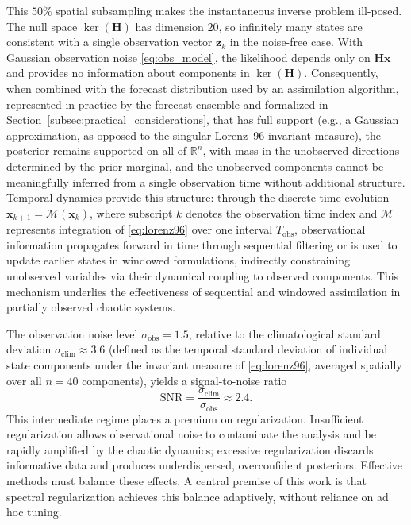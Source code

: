 \documentclass[11pt,a4paper]{article}
\begin{document}
This $50\%$ spatial subsampling makes the instantaneous inverse problem ill-posed. The null space $\ker(\mathbf{H})$ has dimension $20$, so infinitely many states are consistent with a single observation vector $\mathbf{z}_k$ in the noise-free case. With Gaussian observation noise \eqref{eq:obs_model}, the likelihood depends only on $\mathbf{H}\mathbf{x}$ and provides no information about components in $\ker(\mathbf{H})$.
Consequently, when combined with the forecast distribution used by an assimilation algorithm, represented in practice by the forecast ensemble and formalized in Section~\ref{subsec:practical_considerations}, that has full support (e.g., a Gaussian approximation, as opposed to the singular Lorenz–96 invariant measure), the posterior remains supported on all of $\mathbb{R}^n$, with mass in the unobserved directions determined by the prior marginal, and the unobserved components cannot be meaningfully inferred from a single observation time without additional structure.
 Temporal dynamics provide this structure: through the discrete-time evolution $\mathbf{x}_{k+1}=\mathcal{M}(\mathbf{x}_k)$, where subscript $k$ denotes the observation time index and $\mathcal{M}$ represents integration of \eqref{eq:lorenz96} over one interval $T_{\mathrm{obs}}$, observational information propagates forward in time through sequential filtering or is used to update earlier states in windowed formulations, indirectly constraining unobserved variables via their dynamical coupling to observed components. This mechanism underlies the effectiveness of sequential and windowed assimilation in partially observed chaotic systems.

The observation noise level $\sigma_{\mathrm{obs}}=1.5$, relative to the climatological standard deviation $\sigma_{\mathrm{clim}}\approx 3.6$ (defined as the temporal standard deviation of individual state components under the invariant measure of \eqref{eq:lorenz96}, averaged spatially over all $n=40$ components), yields a signal-to-noise ratio
\begin{equation}
\mathrm{SNR}
=
\frac{\sigma_{\mathrm{clim}}}{\sigma_{\mathrm{obs}}}
\approx 2.4.
\label{eq:snr}
\end{equation}
This intermediate regime places a premium on regularization. Insufficient regularization allows observational noise to contaminate the analysis and be rapidly amplified by the chaotic dynamics; excessive regularization discards informative data and produces underdispersed, overconfident posteriors. Effective methods must balance these effects. A central premise of this work is that spectral regularization achieves this balance adaptively, without reliance on ad hoc tuning.
\end{document}
